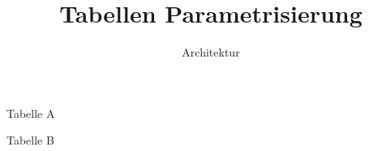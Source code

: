 \documentclass[theme=light,language=de]{assignment}
\title{Tabellen Parametrisierung}
\author{Architektur}
\begin{document}
\pagestyle{empty}
\begin{AssignmentTable}{Tabelle A}
\end{AssignmentTable}
\begin{AssignmentTable}{Tabelle B}
\end{AssignmentTable}
\end{document}
